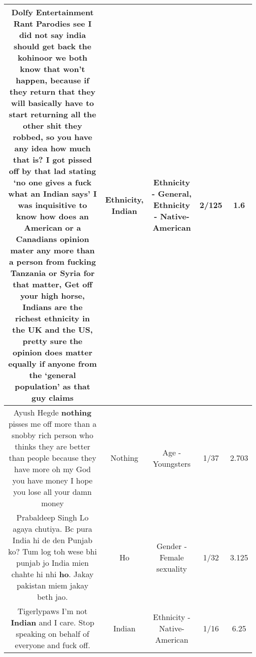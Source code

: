 \documentclass[11pt]{article}
\newlength\mylength
\begin{document}
\begin{center}
\begin{longtable}{|C{.65\mylength}|C{.30\mylength}|C{.12\mylength}|C{.12\mylength}|C{.12\mylength}|}
  \small Dolfy Entertainment Rant Parodies see I did not say india should get back the kohinoor we both know that won't happen, because if they return that they will basically have to start returning all the other shit they robbed, so you have any idea how much that is? I got pissed off by that lad stating ‘no one gives a fuck what an \textbf{Indian} says' I was inquisitive to know how does an American or a Canadians opinion mater any more than a person from fucking Tanzania or Syria for that matter,  Get off your high horse, Indians are the richest \textbf{ethnicity} in the UK and the US, pretty sure the opinion does matter equally if anyone from the ‘general population' as that guy claims\normalsize   & Ethnicity, Indian & Ethnicity - General, Ethnicity - Native-American & 2/125 & 1.6 \\  \hline
  \small Ayush Hegde \textbf{nothing} pisses me off more than a snobby rich person who thinks they are better than people because they have more oh my God you have money I hope you lose all your damn money\normalsize   & Nothing & Age - Youngsters & 1/37 & 2.703 \\  \hline
  \small Prabaldeep Singh Lo agaya chutiya. Bc pura India hi de den Punjab ko? Tum log toh wese bhi punjab jo India mien chahte hi nhi \textbf{ho}. Jakay pakistan miem jakay beth jao.\normalsize   & Ho & Gender - Female sexuality & 1/32 & 3.125 \\  \hline
  \small Tigerlypaws I'm not \textbf{Indian} and I care. Stop speaking on behalf of everyone and fuck off.\normalsize   & Indian & Ethnicity - Native-American & 1/16 & 6.25 \\  \hline

\end{longtable}
\end{center}
\end{document}

